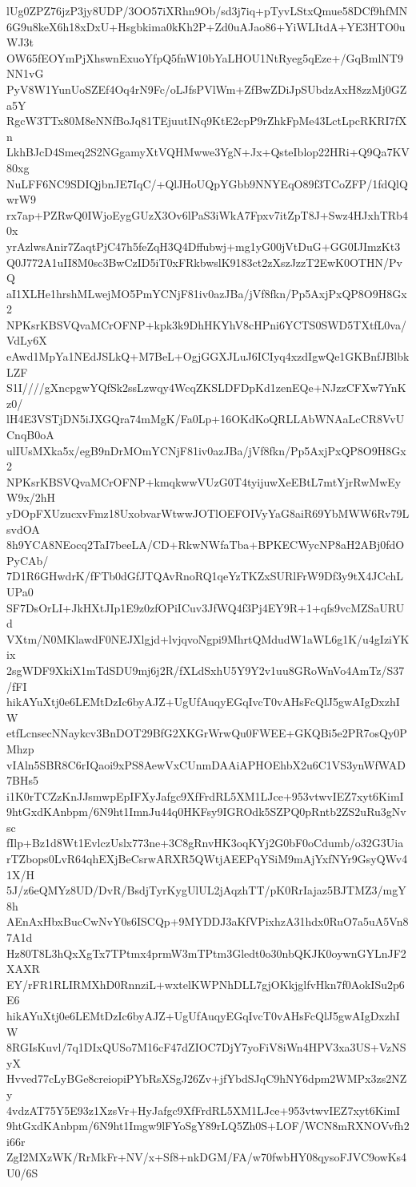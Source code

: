 lUg0ZPZ76jzP3jy8UDP/3OO57iXRhn9Ob/sd3j7iq+pTyvLStxQmue58DCf9hfMN
6G9u8keX6h18xDxU+Hsgbkima0kKh2P+Zd0uAJao86+YiWLItdA+YE3HTO0uWJ3t
OW65fEOYmPjXhswnExuoYfpQ5fnW10bYaLHOU1NtRyeg5qEze+/GqBmlNT9NN1vG
PyV8W1YunUoSZEf4Oq4rN9Fc/oLJfsPVlWm+ZfBwZDiJpSUbdzAxH8zzMj0GZa5Y
RgcW3TTx80M8eNNfBoJq81TEjuutINq9KtE2cpP9rZhkFpMe43LctLpcRKRI7fXn
LkhBJcD4Smeq2S2NGgamyXtVQHMwwe3YgN+Jx+QsteIblop22HRi+Q9Qa7KV80xg
NuLFF6NC9SDIQjbnJE7IqC/+QlJHoUQpYGbb9NNYEqO89f3TCoZFP/1fdQlQwrW9
rx7ap+PZRwQ0IWjoEygGUzX3Ov6lPaS3iWkA7Fpxv7itZpT8J+Swz4HJxhTRb40x
yrAzlwsAnir7ZaqtPjC47h5feZqH3Q4Dffubwj+mg1yG00jVtDuG+GG0IJImzKt3
Q0J772A1uII8M0sc3BwCzID5iT0xFRkbwslK9183ct2zXszJzzT2EwK0OTHN/PvQ
aI1XLHe1hrshMLwejMO5PmYCNjF81iv0azJBa/jVf8fkn/Pp5AxjPxQP8O9H8Gx2
NPKsrKBSVQvaMCrOFNP+kpk3k9DhHKYhV8cHPni6YCTS0SWD5TXtfL0va/VdLy6X
eAwd1MpYa1NEdJSLkQ+M7BeL+OgjGGXJLuJ6ICIyq4xzdIgwQe1GKBnfJBlbkLZF
S1I////gXncpgwYQfSk2ssLzwqy4WcqZKSLDFDpKd1zenEQe+NJzzCFXw7YnKz0/
lH4E3VSTjDN5iJXGQra74mMgK/Fa0Lp+16OKdKoQRLLAbWNAaLcCR8VvUCnqB0oA
ulIUsMXka5x/egB9nDrMOmYCNjF81iv0azJBa/jVf8fkn/Pp5AxjPxQP8O9H8Gx2
NPKsrKBSVQvaMCrOFNP+kmqkwwVUzG0T4tyijuwXeEBtL7mtYjrRwMwEyW9x/2hH
yDOpFXUzucxvFmz18UxobvarWtwwJOTlOEFOIVyYaG8aiR69YbMWW6Rv79LsvdOA
8h9YCA8NEocq2TaI7beeLA/CD+RkwNWfaTba+BPKECWycNP8aH2ABj0fdOPyCAb/
7D1R6GHwdrK/fFTb0dGfJTQAvRnoRQ1qeYzTKZxSURlFrW9Df3y9tX4JCchLUPa0
SF7DsOrLI+JkHXtJIp1E9z0zfOPiICuv3JfWQ4f3Pj4EY9R+1+qfs9vcMZSaURUd
VXtm/N0MKlawdF0NEJXlgjd+lvjqvoNgpi9MhrtQMdudW1aWL6g1K/u4gIziYKix
2sgWDF9XkiX1mTdSDU9mj6j2R/fXLdSxhU5Y9Y2v1uu8GRoWnVo4AmTz/S37/fFI
hikAYuXtj0e6LEMtDzIc6byAJZ+UgUfAuqyEGqIvcT0vAHsFcQlJ5gwAIgDxzhIW
etfLcnsecNNaykcv3BnDOT29BfG2XKGrWrwQu0FWEE+GKQBi5e2PR7osQy0PMhzp
vIAln5SBR8C6rIQaoi9xPS8AewVxCUnmDAAiAPHOEhbX2u6C1VS3ynWfWAD7BHs5
i1K0rTCZzKnJJsmwpEpIFXyJafgc9XfFrdRL5XM1LJce+953vtwvIEZ7xyt6KimI
9htGxdKAnbpm/6N9ht1ImnJu44q0HKFsy9IGROdk5SZPQ0pRntb2ZS2uRu3gNvsc
fIlp+Bz1d8Wt1EvlczUslx773ne+3C8gRnvHK3oqKYj2G0bF0oCdumb/o32G3Uia
rTZbops0LvR64qhEXjBeCsrwARXR5QWtjAEEPqYSiM9mAjYxfNYr9GsyQWv41X/H
5J/z6eQMYz8UD/DvR/BsdjTyrKygUlUL2jAqzhTT/pK0RrIajaz5BJTMZ3/mgY8h
AEnAxHbxBucCwNvY0s6ISCQp+9MYDDJ3aKfVPixhzA31hdx0RuO7a5uA5Vn87A1d
Hz80T8L3hQxXgTx7TPtmx4prmW3mTPtm3Gledt0o30nbQKJK0oywnGYLnJF2XAXR
EY/rFR1RLIRMXhD0RnnziL+wxtelKWPNhDLL7gjOKkjglfvHkn7f0AokISu2p6E6
hikAYuXtj0e6LEMtDzIc6byAJZ+UgUfAuqyEGqIvcT0vAHsFcQlJ5gwAIgDxzhIW
8RGIsKuvl/7q1DIxQUSo7M16cF47dZIOC7DjY7yoFiV8iWn4HPV3xa3US+VzNSyX
Hvved77cLyBGe8creiopiPYbRsXSgJ26Zv+jfYbdSJqC9hNY6dpm2WMPx3zs2NZy
4vdzAT75Y5E93z1XzsVr+HyJafgc9XfFrdRL5XM1LJce+953vtwvIEZ7xyt6KimI
9htGxdKAnbpm/6N9ht1Imgw9lFYoSgY89rLQ5Zh0S+LOF/WCN8mRXNOVvfh2i66r
ZgI2MXzWK/RrMkFr+NV/x+Sf8+nkDGM/FA/w70fwbHY08qysoFJVC9owKs4U0/6S
